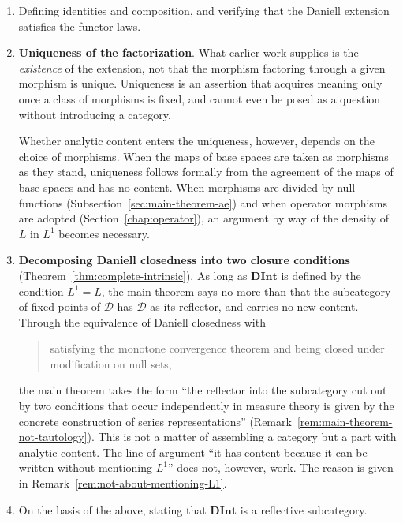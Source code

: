 \begin{enumerate}
  \item Defining identities and composition, and verifying that the Daniell
    extension satisfies the functor laws.
  \item \textbf{Uniqueness of the factorization}. What earlier work supplies is
    the \emph{existence} of the extension, not that the morphism factoring
    through a given morphism is unique.
    Uniqueness is an assertion that acquires meaning only once a class of
    morphisms is fixed, and cannot even be posed as a question without
    introducing a category.

    Whether analytic content enters the uniqueness, however, depends on the
    choice of morphisms.
    When the maps of base spaces are taken as morphisms as they stand,
    uniqueness follows formally from the agreement of the maps of base spaces
    and has no content.
    When morphisms are divided by null functions
    (Subsection~\ref{sec:main-theorem-ae}) and when operator morphisms are
    adopted (Section~\ref{chap:operator}), an argument by way of the density of
    $L$ in $L^1$ becomes necessary.
  \item \textbf{Decomposing Daniell closedness into two closure conditions}
    (Theorem~\ref{thm:complete-intrinsic}).
    As long as $\mathbf{DInt}$ is defined by the condition $L^1=L$, the main
    theorem says no more than that the subcategory of fixed points of
    $\mathcal{D}$ has $\mathcal{D}$ as its reflector, and carries no new
    content.
    Through the equivalence of Daniell closedness with
    \begin{quote}
      satisfying the monotone convergence theorem and being closed under
      modification on null sets,
    \end{quote}
    the main theorem takes the form ``the reflector into the subcategory cut out
    by two conditions that occur independently in measure theory is given by the
    concrete construction of series representations''
    (Remark~\ref{rem:main-theorem-not-tautology}).
    This is not a matter of assembling a category but a part with analytic
    content.
    The line of argument ``it has content because it can be written without
    mentioning $L^1$'' does not, however, work.
    The reason is given in
    Remark~\ref{rem:not-about-mentioning-L1}.
  \item On the basis of the above, stating that $\mathbf{DInt}$ is a reflective
    subcategory.
\end{enumerate}

